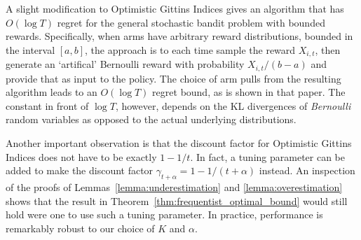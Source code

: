 A slight modification to Optimistic Gittins Indices gives an algorithm that has $O(\log T)$ regret for the general stochastic bandit problem with bounded rewards. Specifically, when arms have arbitrary reward distributions, bounded in the interval $[a,b]$, the approach is to each time sample the reward $X_{i,t}$, then generate an `artifical' Bernoulli reward with probability $X_{i,t}/(b-a)$ and provide that as input to the policy. The choice of arm pulls from the resulting algorithm leads to an $O(\log T)$ regret bound, as is shown in that paper. The constant in front of $\log T$, however, depends on the KL divergences of \emph{Bernoulli} random variables as opposed to the actual underlying distributions.

Another important observation is that the discount factor for Optimistic Gittins Indices does not have to be exactly $1-1/t$. In fact, a tuning parameter can be added to make the discount factor $\gamma_{t+\alpha} = 1-1/(t+\alpha)$ instead. An inspection of the proofs of Lemmas~\ref{lemma:underestimation} and \ref{lemma:overestimation} shows that the result in Theorem~\ref{thm:frequentist_optimal_bound} would still hold were one to use such a tuning parameter. In practice, performance is remarkably robust to our choice of $K$ and $\alpha$.